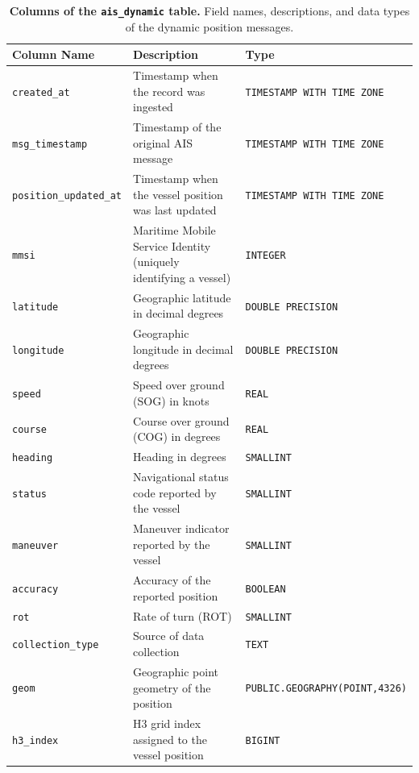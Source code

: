 \documentclass[10pt,a4paper]{article}
\begin{document}
\begin{table}[ht]
\caption{\textbf{Columns of the \texttt{ais\_dynamic} table.} Field names, descriptions, and data types of the dynamic position messages.}
\label{tab:ais-dynamic-variables}
\vspace{0.2cm}
\centering
\small
\begin{tabular}{@{}p{}p{}p{}@{}}
\toprule
{\bfseries Column Name} & {\bfseries Description} & {\bfseries Type} \\
\midrule
\texttt{created\_at} & Timestamp when the record was ingested & \texttt{TIMESTAMP WITH TIME ZONE} \\
\texttt{msg\_timestamp} & Timestamp of the original AIS message & \texttt{TIMESTAMP WITH TIME ZONE} \\
\texttt{position\_updated\_at} & Timestamp when the vessel position was last updated & \texttt{TIMESTAMP WITH TIME ZONE} \\
\texttt{mmsi} & Maritime Mobile Service Identity (uniquely identifying a vessel) & \texttt{INTEGER} \\
\texttt{latitude} & Geographic latitude in decimal degrees & \texttt{DOUBLE PRECISION} \\
\texttt{longitude} & Geographic longitude in decimal degrees & \texttt{DOUBLE PRECISION} \\
\texttt{speed} & Speed over ground (SOG) in knots & \texttt{REAL} \\
\texttt{course} & Course over ground (COG) in degrees & \texttt{REAL} \\
\texttt{heading} & Heading in degrees & \texttt{SMALLINT} \\
\texttt{status} & Navigational status code reported by the vessel & \texttt{SMALLINT} \\
\texttt{maneuver} & Maneuver indicator reported by the vessel & \texttt{SMALLINT} \\
\texttt{accuracy} & Accuracy of the reported position & \texttt{BOOLEAN} \\
\texttt{rot} & Rate of turn (ROT) & \texttt{SMALLINT} \\
\texttt{collection\_type} & Source of data collection & \texttt{TEXT} \\
\texttt{geom} & Geographic point geometry of the position & \texttt{PUBLIC.GEOGRAPHY(POINT,4326)} \\
\texttt{h3\_index} & H3 grid index assigned to the vessel position & \texttt{BIGINT} \\
\bottomrule
\end{tabular}
\end{table}
\end{document}
